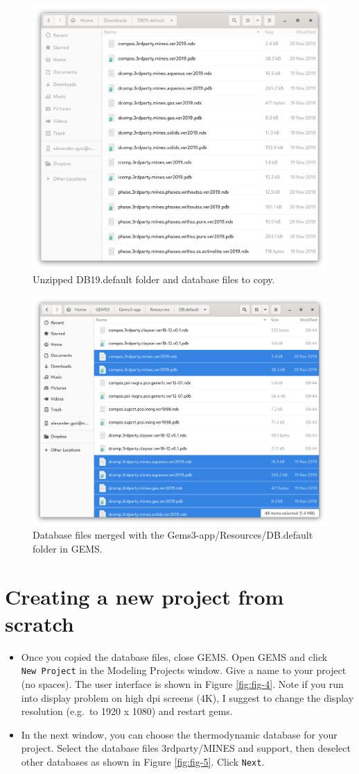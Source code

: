\documentclass[
]{book}
\begin{document}
\begin{figure}
 \includegraphics[width=0.7\linewidth]{figures/module1/fig-2} \caption{Unzipped DB19.default folder and database files to copy.}\label{fig:fig-2}
 \end{figure}

\begin{figure}
\includegraphics[width=0.7\linewidth]{figures/module1/fig-3} \caption{Database files merged with the Gems3-app/Resources/DB.default folder in GEMS.}\label{fig:fig-3}
\end{figure}

\hypertarget{creating-a-new-project-from-scratch}{%
\section{Creating a new project from scratch}\label{creating-a-new-project-from-scratch}}

\begin{itemize}
\item
  Once you copied the database files, close GEMS. Open GEMS and click \texttt{New\ Project} in the Modeling Projects window. Give a name to your project (no spaces). The user interface is shown in Figure \ref{fig:fig-4}. Note if you run into display problem on high dpi screens (4K), I suggest to change the display resolution (e.g.~to 1920 x 1080) and restart gems.
\item
  In the next window, you can choose the thermodynamic database for your project. Select the database files 3rdparty/MINES and support, then deselect other databases as shown in Figure \ref{fig:fig-5}. Click \texttt{Next}.
\end{itemize}
\end{document}
